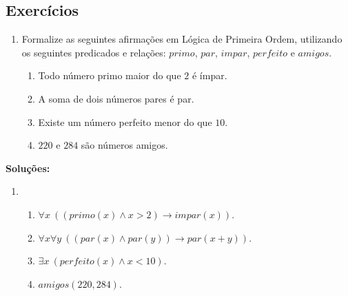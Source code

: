    \subsection{Exercícios}

    \begin{enumerate}
        \item Formalize as seguintes afirmações em Lógica de Primeira Ordem, utilizando os seguintes predicados e relações: $primo$, $par$, $impar$, $perfeito$ e $amigos$.
        \begin{enumerate}
            \item Todo número primo maior do que $2$ é ímpar.
            \item A soma de dois números pares é par.
            \item Existe um número perfeito menor do que $10$.
            \item $220$ e $284$ são números amigos.
        \end{enumerate}
    \end{enumerate}

    \textbf{Soluções:}

    \begin{enumerate}
        \item
        \begin{enumerate}
            \item $\forall x \ ((primo(x) \land x > 2) \rightarrow impar(x))$.
            \item $\forall x \forall y \ ((par(x) \land par(y)) \rightarrow par(x + y))$.
            \item $\exists x \ (perfeito(x) \land x < 10)$.
            \item $amigos(220, 284)$.
        \end{enumerate}
    \end{enumerate}
